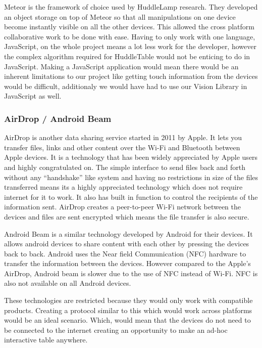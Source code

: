 Meteor is the framework of choice used by HuddleLamp research.
They developed an object storage on top of Meteor so that all manipulations
on one device become instantly visible on all the other devices. This
allowed the cross platform collaborative work to be done with ease.
Having to only work with one language, JavaScript, on the whole project
means a lot less work for the developer, however the complex algorithm
required for HuddleTable would not be enticing to do in JavaScript. Making a JavaScript application would mean there would be an inherent limitations to our project like getting touch information from the devices would be difficult, additionaly we would have had to use our Vision Library in JavaScript as well.
 
 
\subsubsection{AirDrop / Android Beam}
 
AirDrop\cite{airdrop} is another data sharing service started in
2011 by Apple. It lets you transfer files, links and other content
over the Wi-Fi and Bluetooth between Apple devices. It is a technology
that has been widely appreciated by Apple users and highly congratulated
on. The simple interface to send files back and forth without any
``handshake'' like system and having no restrictions in size of
the files transferred means its a highly appreciated technology which
does not require internet for it to work. It also has built in function
to control the recipients of the information sent. AirDrop creates
a peer-to-peer Wi-Fi network between the devices and files are
sent encrypted which means the file transfer is also secure.
 
Android Beam\cite{android-beam} is a similar technology developed
by Android for their devices. It allows android devices to share content
with each other by pressing the devices back to back. Android uses
the Near field Communication (NFC) hardware to transfer the information
between the devices. However compared to the Apple's AirDrop, Android
beam is slower due to the use of NFC instead of Wi-Fi. NFC is also not
available on all Android devices.
 
These technologies are restricted because they would only work with
compatible products. Creating a protocol similar to this which would work
across platforms would be an ideal scenario. Which, would mean that the
devices do not need to be connected to the internet creating an
opportunity to make an ad-hoc interactive table anywhere.
 

